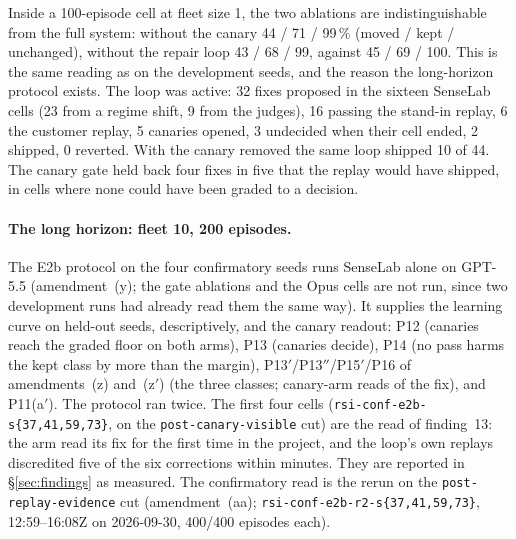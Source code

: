 \documentclass[11pt]{article}
\newcommand{\code}[1]{\texttt{#1}}
\begin{document}
Inside a 100-episode cell at fleet size 1, the two ablations are indistinguishable from the full
system: without the canary 44 / 71 / 99\,\% (moved / kept / unchanged), without the repair loop
43 / 68 / 99, against 45 / 69 / 100. This is the same reading as on the development seeds, and
the reason the long-horizon protocol exists. The loop was active: 32 fixes proposed in the
sixteen SenseLab cells (23 from a regime shift, 9 from the judges), 16 passing the stand-in
replay, 6 the customer replay, 5 canaries opened, 3 undecided when their cell ended, 2 shipped,
0 reverted. With the canary removed the same loop shipped 10 of 44. The canary gate held back
four fixes in five that the replay would have shipped, in cells where none could have been
graded to a decision.

\paragraph{The long horizon: fleet 10, 200 episodes.} The E2b protocol on the four confirmatory
seeds runs SenseLab alone on GPT-5.5 (amendment~(y); the gate ablations and the Opus cells are
not run, since two development runs had already read them the same way). It supplies the
learning curve on held-out seeds, descriptively, and the canary readout: P12 (canaries reach the
graded floor on both arms), P13 (canaries decide), P14 (no pass harms the kept class by more
than the margin), P13$'$/P13$''$/P15$'$/P16 of amendments~(z) and~(z$'$) (the three classes;
canary-arm reads of the fix), and P11(a$'$). The protocol ran twice. The first four cells
(\code{rsi-conf-e2b-s\{37,41,59,73\}}, on the \code{post-canary-visible} cut) are the read of
finding~13: the arm read its fix for the first time in the project, and the loop's own replays
discredited five of the six corrections within minutes. They are reported in
\S\ref{sec:findings} as measured. The confirmatory read is the rerun on the
\code{post-replay-evidence} cut (amendment~(aa); \code{rsi-conf-e2b-r2-s\{37,41,59,73\}},
12:59--16:08Z on 2026-09-30, 400/400 episodes each).
\end{document}
